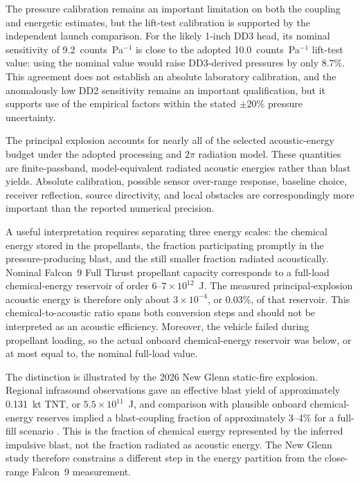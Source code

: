 \documentclass[]{seismica}
\begin{document}
The pressure calibration remains an important limitation on both the
coupling and energetic estimates, but the lift-test calibration is supported
by the independent launch comparison. For the likely 1-inch DD3 head, its
nominal sensitivity of 9.2~counts~Pa$^{-1}$ is close to the adopted
10.0~counts~Pa$^{-1}$ lift-test value: using the nominal value would raise
DD3-derived pressures by only 8.7\%. This agreement does not establish an
absolute laboratory calibration, and the anomalously low DD2 sensitivity
remains an important qualification, but it supports use of the empirical
factors within the stated $\pm20\%$ pressure uncertainty.

The principal explosion accounts for nearly all of the selected
acoustic-energy budget under the adopted processing and $2\pi$ radiation
model. These quantities are finite-passband, model-equivalent radiated acoustic
energies rather than blast yields. Absolute calibration, possible sensor
over-range response, baseline choice, receiver reflection, source directivity,
and local obstacles are correspondingly more important than the reported
numerical precision.

A useful interpretation requires separating three energy scales:
the chemical energy stored in the propellants, the fraction participating
promptly in the pressure-producing blast, and the still smaller fraction
radiated acoustically. Nominal Falcon~9 Full Thrust propellant capacity
corresponds to a full-load chemical-energy reservoir of order
$6$--$7\times10^{12}$~J. The measured principal-explosion acoustic energy is
therefore only about $3\times10^{-4}$, or 0.03\%, of that reservoir. This
chemical-to-acoustic ratio spans both conversion steps and should not be
interpreted as an acoustic efficiency. Moreover, the vehicle failed during
propellant loading, so the actual onboard chemical-energy reservoir was below,
or at most equal to, the nominal full-load value.

The distinction is illustrated by the 2026 New Glenn static-fire explosion.
Regional infrasound observations gave an effective blast yield of approximately
0.131~kt TNT, or $5.5\times10^{11}$~J, and comparison with plausible onboard
chemical-energy reserves implied a blast-coupling fraction of approximately
3--4\% for a full-fill scenario
\citep{silber_scamfer_newglenn_2026}. This is the fraction of chemical energy
represented by the inferred impulsive blast, not the fraction radiated as
acoustic energy. The New Glenn study therefore constrains a different step in
the energy partition from the close-range Falcon~9 measurement.
\end{document}
